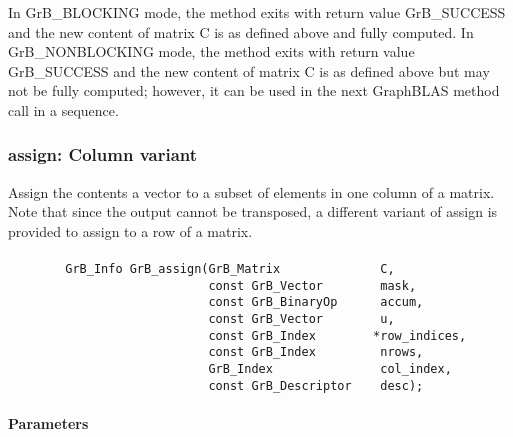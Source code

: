 In {\sf GrB\_BLOCKING} mode, the method exits with return value 
{\sf GrB\_SUCCESS} and the new content of matrix {\sf C} is as defined above
and fully computed.  
In {\sf GrB\_NONBLOCKING} mode, the method exits with return value 
{\sf GrB\_SUCCESS} and the new content of matrix {\sf C} is as defined above 
but may not be fully computed; however, it can be used in the next GraphBLAS 
method call in a sequence.

\subsubsection{{\sf assign}: Column variant}

Assign the contents a vector to a subset of elements in one column of a matrix. 
Note that since the output cannot be transposed, a different variant of
{\sf assign} is provided to assign to a row of a matrix.


\paragraph{\syntax}

\begin{verbatim}
        GrB_Info GrB_assign(GrB_Matrix              C,
                            const GrB_Vector        mask,
                            const GrB_BinaryOp      accum,
                            const GrB_Vector        u,
                            const GrB_Index        *row_indices,
                            const GrB_Index         nrows,
                            GrB_Index               col_index,
                            const GrB_Descriptor    desc); 
\end{verbatim}

\paragraph{Parameters}

